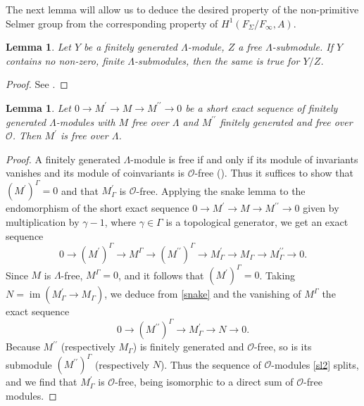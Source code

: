 \documentclass[12 pt]{amsart}
\theoremstyle{plain}
\newtheorem{lem}[thm]{Lemma}
\theoremstyle{definition}
\numberwithin{equation}{section}
\numberwithin{table}{section}
\begin{document}
\indent The next lemma will allow us to deduce the desired property of the non-primitive Selmer group from the corresponding property of $H^1(F_\Sigma/F_\infty,A)$.
\begin{lem}
\label{no-subs-quot}
Let $Y$ be a finitely generated $\Lambda$-module, $Z$ a free $\Lambda$-submodule. If $Y$ contains no non-zero, finite $\Lambda$-submodules, then the same is true for $Y/Z$.
\end{lem}
\begin{proof}
See \cite[Lemma 2.6]{GV00}.
\end{proof}
\begin{lem}
\label{free-lambda}
Let $0\rightarrow M^\prime\rightarrow M\rightarrow M^{\prime\prime}\rightarrow 0$ be a short exact sequence of finitely generated $\Lambda$-modules with $M$ free over $\Lambda$ and $M^{\prime\prime}$ finitely generated and free over $\mathscr{O}$. Then $M^\prime$ is free over $\Lambda$.
\end{lem}
\begin{proof}
A finitely generated $\Lambda$-module is free if and only if its module of invariants vanishes and its module of coinvariants is $\mathscr{O}$-free (\cite[Proposition 5.3.19 (ii)]{NSW}). Thus it suffices to show that $(M^\prime)^{\Gamma}=0$ and that $M^\prime_{\Gamma}$ is $\mathscr{O}$-free. Applying the snake lemma to the endomorphism of the short exact sequence $0\rightarrow M^\prime\rightarrow M\rightarrow M^{\prime\prime}\rightarrow 0$ given by multiplication by $\gamma-1$, where $\gamma\in\Gamma$ is a topological generator, we get an exact sequence
\begin{equation}
\label{snake}
0\rightarrow(M^\prime)^{\Gamma}\rightarrow M^{\Gamma}\rightarrow(M^{\prime\prime})^\Gamma\rightarrow M_\Gamma^\prime
\rightarrow M_\Gamma\rightarrow M^{\prime\prime}_\Gamma\rightarrow 0\text{.}
\end{equation}
Since $M$ is $\Lambda$-free, $M^{\Gamma}=0$, and it follows that $(M^\prime)^{\Gamma}=0$. Taking $N=\operatorname{im}(M_{\Gamma}^\prime\rightarrow M_\Gamma)$, we deduce from \cref{snake} and the vanishing of $M^{\Gamma}$ the exact sequence
\begin{equation}
\label{sl2}
0\rightarrow (M^{\prime\prime})^{\Gamma}\rightarrow M_\Gamma^\prime\rightarrow N\rightarrow 0\text{.}
\end{equation}
Because $M^{\prime\prime}$ (respectively $M_\Gamma$) is finitely generated and $\mathscr{O}$-free, so is its submodule $(M^{\prime\prime})^{\Gamma}$ (respectively $N$). Thus the sequence of $\mathscr{O}$-modules \cref{sl2} splits, and we find that $M_\Gamma^\prime$ is $\mathscr{O}$-free, being isomorphic to a direct sum of $\mathscr{O}$-free modules.
\end{proof}
\end{document}
